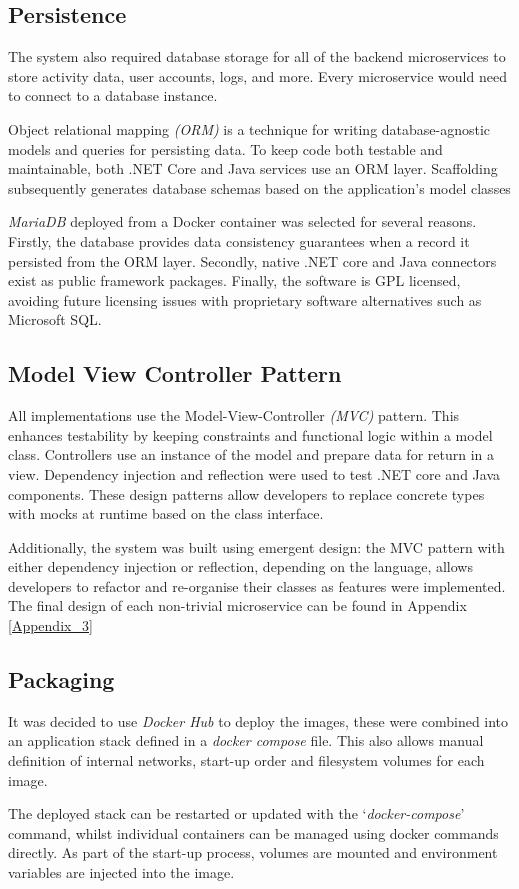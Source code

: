 \subsection{Persistence}
    \par
    The system also required database storage for all of the backend microservices to store activity data, user accounts, logs, and more. Every microservice would need to connect to a database instance.

    \par
    Object relational mapping \textit{(ORM)} is a technique for writing database-agnostic models and queries for persisting data. To keep code both testable and maintainable, both .NET Core and Java services use an ORM layer. Scaffolding subsequently generates database schemas based on the application's model classes

    \par
    \textit{MariaDB}\cite{MariaDB} deployed from a Docker container was selected for several reasons. Firstly, the database provides data consistency guarantees when a record it persisted from the ORM layer. Secondly, native .NET core and Java connectors exist as public framework packages. Finally, the software is GPL licensed, avoiding future licensing issues with proprietary software alternatives such as Microsoft SQL.

\subsection{Model View Controller Pattern}
    \par
    All implementations use the Model-View-Controller \textit{(MVC)}
    pattern. This enhances testability by keeping constraints and functional logic within a model class. Controllers use an instance of the model and prepare data for return in a view. Dependency injection and reflection were used to test .NET core and Java components. These design patterns allow developers to replace concrete types with mocks at runtime based on the class interface.

    \par
    Additionally, the system was built using emergent design: the MVC pattern with either dependency injection or reflection, depending on the language, allows developers to refactor and re-organise their classes as features were implemented. The final design of each non-trivial microservice can be found in Appendix \ref{Appendix_3}

\subsection{Packaging}
    \par
    It was decided to use \textit{Docker Hub} to deploy the images, these were combined into an application stack defined in a \textit{docker compose} file. This also allows manual definition of internal networks, start-up order and filesystem volumes for each image.

    \par
    The deployed stack can be restarted or updated with the `\textit{docker-compose}' command, whilst individual containers can be managed using docker commands directly. As part of the start-up process, volumes are mounted and environment variables are injected into the image.
